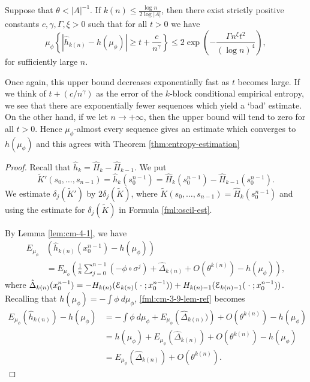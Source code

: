 \begin{theorem} \label{thm:cm-4-2}
	Suppose that $\theta < |A|^{-1}$. If $k(n) \leq \frac{\log{n}}{2\log{|A|}}$, then there exist strictly positive constants $c, \gamma, \Gamma, \xi > 0$ such that for all $t > 0$ we have
	\begin{equation}
		\mu_\phi\left\{\left|\hat{h}_{k(n)} - h(\mu_\phi)\right| \geq t + \frac{c}{n^\gamma}\right\} \leq 2\exp\left(-\frac{\Gamma n^\xi t^2}{(\log{n})^4}\right),
	\end{equation}
	for sufficiently large $n$.
	
	Once again, this upper bound decreases exponentially fast as $t$ becomes large. If we think of $t + (c / n^\gamma)$ as the error of the $k$-block conditional empirical entropy, we see that there are exponentially fewer sequences which yield a `bad' estimate. On the other hand, if we let $n \to +\infty$, then the upper bound will tend to zero for all $t > 0$. Hence $\mu_\phi$-almost every sequence gives an estimate which converges to $h(\mu_\phi)$ and this agrees with Theorem \ref{thm:entropy-estimation}
	
	\begin{proof}
		Recall that $\hat{h}_k = \hat{H}_k - \hat{H}_{k - 1}$. We put
		\[
			\tilde{K}'(s_0, \dots, s_{n - 1}) = \hat{h}_k(s_0^{n - 1}) = \hat{H}_k(s_0^{n - 1}) - \hat{H}_{k - 1}(s_0^{n - 1}).
		\]
		We estimate $\delta_j(\tilde{K}')$ by $2\delta_j(\tilde{K})$, where $\tilde{K}(s_0, \dots, s_{n - 1}) = \hat{H}_k(s_0^{n - 1})$ and using the estimate for $\delta_j(\tilde{K})$ in Formula \eqref{fml:oscil-est}.
		
		By Lemma \ref{lem:cm-4-1}, we have
		\begin{align}
			E_{\mu_\phi}&\left(\hat{h}_{k(n)}(x_0^{n - 1}) - h(\mu_\phi)\right) \nonumber \\
				&= E_{\mu_\phi}\left(\frac{1}{n}\sum_{j = 0}^{n - 1}(-\phi \circ \sigma^j) + \hat{\Delta}_{k(n)} + O(\theta^{k(n)}) - h(\mu_\phi)\right), \label{fml:cm-3-9-lem-ref}
		\end{align}
		where $\hat{\Delta}_{k(n)}(x_0^{n - 1}) = -H_{k(n)}(\mathcal{E}_{k(n)}(\mathrel{}\cdot\mathrel{}; x_0^{n - 1})) + H_{k(n) - 1}(\mathcal{E}_{k(n) - 1}(\mathrel{}\cdot\mathrel{}; x_0^{n - 1}))$. 
		Recalling that $h(\mu_\phi) = -\int{\phi\ d\mu_\phi}$, \eqref{fml:cm-3-9-lem-ref} becomes
		\begin{align*}
			E_{\mu_\phi}\left(\hat{h}_{k(n)}\right) - h(\mu_\phi) &= -\int{\phi\ d\mu_\phi} + E_{\mu_\phi}\left(\hat{\Delta}_{k(n)})\right) + O(\theta^{k(n)}) - h(\mu_\phi) \\
				&= h(\mu_\phi) + E_{\mu_\phi}\left(\hat{\Delta}_{k(n)}\right) + O(\theta^{k(n)}) - h(\mu_\phi) \\
				&= E_{\mu_\phi}\left(\hat{\Delta}_{k(n)}\right) + O(\theta^{k(n)}).
		\end{align*}
		

\end{proof}
\end{theorem}
